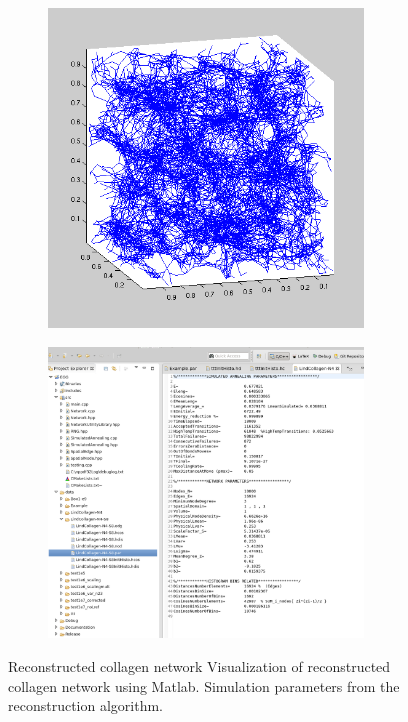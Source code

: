 \begin{figure}[h!]
  \centering
  \begin{subfigure}{0.5\textwidth}
    \centering
    \includegraphics[width=0.92\textwidth]{Figures/chapter-reconstruct/networkN10000.png}%
    \label{collagen_network}
  \end{subfigure}%
  \begin{subfigure}{0.5\textwidth}
    \centering
    \includegraphics[width=0.92\textwidth]{Figures/chapter-reconstruct/parametersN10000.png}%
    \label{collagen_param}
  \end{subfigure}

\caption[Testing with theoretical collagen data]{ Reconstructed collagen
network  Visualization of reconstructed collagen
network using Matlab.  Simulation parameters from the reconstruction
algorithm.}
\label{fig:collagen-network}
\end{figure}



